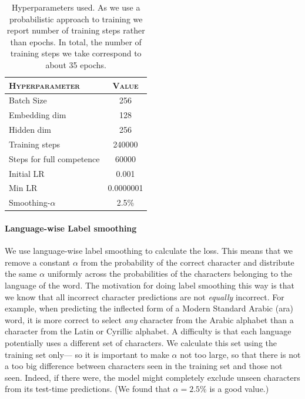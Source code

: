 \documentclass[11pt,a4paper]{article}
\begin{document}
\begin{table}[ht!]	
\centering
\begin{tabular}{lc}
\textsc{Hyperparameter} & \textsc{Value} \\
  \hline
  Batch Size & 256 \\
  Embedding dim & 128 \\
  Hidden dim & 256 \\
  Training steps & 240000 \\
  Steps for full competence & 60000 \\
  Initial LR & 0.001 \\
  Min LR & 0.0000001 \\
  Smoothing-$\alpha$ & 2.5\%
\end{tabular} 
\caption{Hyperparameters used. As we use a probabilistic approach to
training we report number of training steps rather than epochs. In
total, the number of training steps we take correspond to about 35
epochs.}
\label{tab:hp}
\end{table}


\paragraph{Language-wise Label smoothing} We use language-wise label
smoothing to calculate the loss. This means that we remove a constant $\alpha$
from the probability of the correct character and distribute the same
$\alpha$ uniformly across the probabilities of the characters
belonging to the language of the word. The motivation for doing label
smoothing this way is that we know that all incorrect character
predictions are not \emph{equally} incorrect. For example, when
predicting the inflected form of a Modern Standard Arabic (ara) word,
it is more correct to select \emph{any} character from the Arabic
alphabet than a character from the Latin or Cyrillic alphabet.  A
difficulty is that each language potentially uses a different set of
characters. We calculate this set using the training set only--- so it
is important to make $\alpha$ not too large, so that there is not a
too big difference between characters seen in the training set and
those not seen.  Indeed, if there were, the model might completely
exclude unseen characters from its test-time predictions. (We found
that \(\alpha=2.5\%\) is a good value.)

\end{document}
